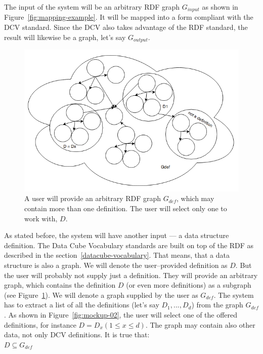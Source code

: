 The input of the system will be an arbitrary RDF graph $G_{input}$ as shown
in Figure~\ref{fig:mapping-example}. It will be mapped into a form compliant
with the DCV standard. Since the DCV also takes advantage of the RDF standard,
the result will likewise be a graph, let's say $G_{output}$.

\begin{figure}
	\centering
	\includegraphics[width=120mm]{img/definition-in-graph.png}
	\caption{A user will provide an arbitrary RDF graph $G_{def}$, which may contain more than one definition. The user will select only one to work with, $D$.}
	\label{fig:definition-in-graph}
\end{figure}

As stated before, the system will have another input --- a data structure 
definition. The Data Cube Vocabulary standards are built on top of the RDF as described in the 
section~\ref{datacube-vocabulary}. That means, that a data structure is also a 
graph. We will denote the user--provided definition as $D$. But the user will probably not 
supply just a definition. They will provide an arbitrary graph, which contains the definition $D$ 
(or even more definitions) as a subgraph (see Figure~\ref{fig:definition-in-graph}).
We will denote a graph
supplied by the user as $G_{def}$. The system has to extract a list of all the definitions
(let's say $D_1, ..., D_d$) from the graph $G_{def}$. As shown in Figure~\ref{fig:mockup-02},
the user will select one of the offered definitions, for instance $D = D_x (1 \leq x \leq d)$.
The graph may contain also other data, not only DCV definitions. It is true 
that:\\

{\centering $D \subseteq G_{def}$ \\[0.5cm]}


